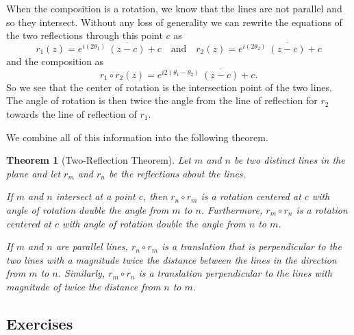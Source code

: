 \documentclass[
]{book}
\newtheorem{theorem}{Theorem}[chapter]
\theoremstyle{definition}
\theoremstyle{definition}
\theoremstyle{definition}
\theoremstyle{definition}
\theoremstyle{remark}
\begin{document}
When the composition is a rotation, we know that the lines are not parallel and so they intersect. Without any loss of generality we can rewrite the equations of the two reflections through this point \(c\) as
\[r_1(z) = e^{i (2\theta_1)} \: \overline{(z-c)} +c \quad \mbox{and} \quad r_2(z) = e^{i (2\theta_2)} \: \overline{(z-c)} + c\]
and the composition as \[r_1 \circ r_2 (z) = e^{i2(\theta_1-\theta_2)} \: \overline{(z-c)} +c.\]
So we see that the center of rotation is the intersection point of the two lines. The angle of rotation is then twice the angle from the line of reflection for \(r_2\) towards the line of reflection of \(r_1\).

We combine all of this information into the following theorem.

\begin{theorem}[Two-Reflection Theorem]
Let \(m\) and \(n\) be two distinct lines in the plane and let \(r_m\) and \(r_n\) be the reflections about the lines.

If \(m\) and \(n\) intersect at a point \(c\), then \(r_n\circ r_m\) is a rotation centered at \(c\) with angle of rotation double the angle from \(m\) to \(n\). Furthermore, \(r_m \circ r_n\) is a rotation centered at \(c\) with angle of rotation double the angle from \(n\) to \(m\).

If \(m\) and \(n\) are parallel lines, \(r_n\circ r_m\) is a translation that is perpendicular to the two lines with a magnitude twice the distance between the lines in the direction from \(m\) to \(n\). Similarly, \(r_m \circ r_n\) is a translation perpendicular to the lines with magnitude of twice the distance from \(n\) to \(m\).
\end{theorem}

\hypertarget{exercises-54}{%
\subsection{Exercises}\label{exercises-54}}
\end{document}
